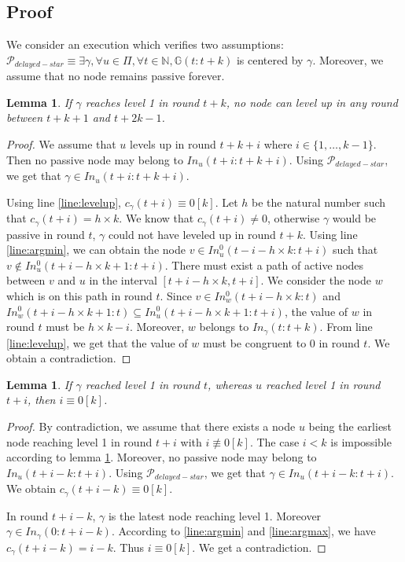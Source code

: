 \documentclass[11pt,letterpaper]{article}
\newtheorem{lem}[thm]{Lemma}
\newcommand{\cent}{\gamma}
\begin{document}
\subsection{Proof}

We consider an execution which verifies two assumptions:
$\mathcal{P}_{delayed-star} \equiv \exists \cent, \forall u \in \Pi, \forall t \in \mathds{N}, \mathds{G}(t:t+k)$ is centered by $\cent$.
Moreover, we assume that no node remains passive forever.

\begin{lem} \label{lem:no-close-levelup}
	If $\cent$ reaches level 1 in round $t+k$, no node can level up in any round between $t+k+1$ and $t+2k-1$.
\end{lem}
\begin{proof}
	We assume that $u$ levels up in round $t+k+i$ where $i \in \{1, \dots, k-1\}$.
	Then no passive node may belong to $In_u(t+i:t+k+i)$.
	Using $\mathcal{P}_{delayed-star}$, we get that $\cent \in In_u(t+i:t+k+i)$.

	Using line \ref{line:levelup}, $c_\cent(t+i) \equiv 0 [k]$. Let $h$ be the natural number such that $c_\cent(t+i) = h \times k$.
	We know that $c_\cent(t+i) \neq 0$, otherwise $\cent$ would be passive in round $t$, $\cent$ could not have leveled up in round $t+k$.
	Using line \ref{line:argmin}, we can obtain the node $v \in In_u^0(t-i-h\times k:t+i)$ such that $v \notin In_u^0(t+i-h\times k+1:t+i)$.
	There must exist a path of active nodes between $v$ and $u$ in the interval $[t+i-h\times k, t+i]$.
	We consider the node $w$ which is on this path in round $t$.
	Since $v \in In_w^0(t+i-h\times k:t)$ and $In_w^0(t+i-h\times k+1:t) \subseteq In_u^0(t+i-h\times k+1:t+i)$,
	the value of $w$ in round $t$ must be $h\times k - i$.
	Moreover, $w$ belongs to $In_\cent(t:t+k)$. From line \ref{line:levelup}, we get that the value of $w$ must be congruent to 0 in round $t$.
	We obtain a contradiction.
\end{proof}

\begin{lem} \label{lem:later-level}
	If $\cent$ reached level 1 in round $t$, whereas $u$ reached level 1 in round $t+i$, then $i \equiv 0 [k]$. 
\end{lem}
\begin{proof}
	By contradiction, we assume that there exists a node $u$ being the earliest node reaching level 1 in round $t+i$ with $i \not\equiv 0 [k]$.
	The case $i < k$ is impossible according to lemma \ref{lem:no-close-levelup}.
	Moreover, no passive node may belong to $In_u(t+i-k:t+i)$.
	Using $\mathcal{P}_{delayed-star}$, we get that $\cent \in In_u(t+i-k:t+i)$.
	We obtain $c_\cent(t+i-k) \equiv 0 [k]$.

	In round $t+i-k$, $\cent$ is the latest node reaching level 1. Moreover $\cent \in In_\cent(0:t+i-k)$.
	According to \ref{line:argmin} and \ref{line:argmax}, we have $c_\cent(t+i-k) = i-k$.
	Thus $i \equiv 0 [k]$. We get a contradiction.
\end{proof}
\end{document}
